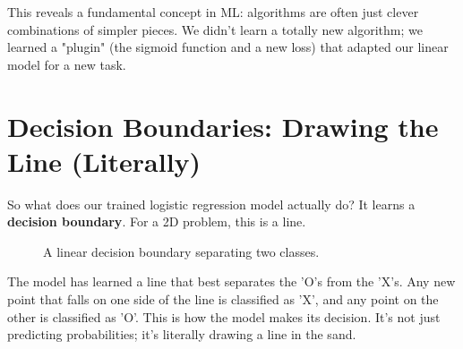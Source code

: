 \documentclass[11pt, letterpaper, openany]{book}
\begin{document}
This reveals a fundamental concept in ML: algorithms are often just clever combinations of simpler pieces. We didn't learn a totally new algorithm; we learned a "plugin" (the sigmoid function and a new loss) that adapted our linear model for a new task.

\section{Decision Boundaries: Drawing the Line (Literally)}

So what does our trained logistic regression model actually do? It learns a \textbf{decision boundary}. For a 2D problem, this is a line.

\begin{figure}[h!]
\centering
{}
\caption{A linear decision boundary separating two classes.}
\end{figure}

The model has learned a line that best separates the 'O's from the 'X's. Any new point that falls on one side of the line is classified as 'X', and any point on the other is classified as 'O'. This is how the model makes its decision. It's not just predicting probabilities; it's literally drawing a line in the sand.
\end{document}
